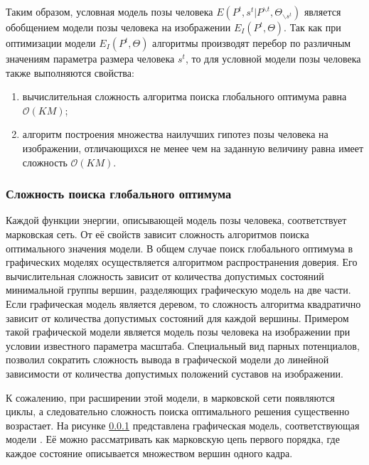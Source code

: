 Таким образом, условная модель позы человека $E(P^t, s^t| P^{\backslash t}, \Theta_{\backslash s^t})$ является обобщением модели позы человека на изображении $E_I(P^t, \Theta)$. Так как при оптимизации модели $E_I(P^t, \Theta)$ алгоритмы производят перебор по различным значениям параметра размера человека $s^t$, то для условной модели позы человека также выполняются свойства:
\begin{enumerate}
	\item вычислительная сложность алгоритма поиска глобального оптимума равна $\mathcal{O}(KM)$;
	\item алгоритм построения множества наилучших гипотез позы человека на изображении, отличающихся не менее чем на заданную величину равна имеет сложность $\mathcal{O}(KM)$.
\end{enumerate}

\subsubsection{Сложность поиска глобального оптимума}

Каждой функции энергии, описывающей модель позы человека, соответствует марковская сеть. От её свойств зависит сложность алгоритмов поиска оптимального значения модели. В общем случае поиск глобального оптимума в графических моделях осуществляется алгоритмом распространения доверия. Его вычислительная сложность зависит от количества допустимых состояний минимальной группы вершин, разделяющих графическую модель на две части. Если графическая модель является деревом, то сложность алгоритма квадратично зависит от количества допустимых состояний для каждой вершины. Примером такой графической модели является модель позы человека на изображении при условии известного параметра масштаба. Специальный вид парных потенциалов, позволил сократить сложность вывода в графической модели до линейной зависимости от количества допустимых положений суставов на изображении.

К сожалению, при расширении этой модели, в марковской сети появляются циклы, а следовательно сложность поиска оптимального решения существенно возрастает. На рисунке \ref{} представлена графическая модель, соответствующая модели \cite{park2011n}. Её можно рассматривать как марковскую цепь первого порядка, где каждое состояние описывается множеством вершин одного кадра.

